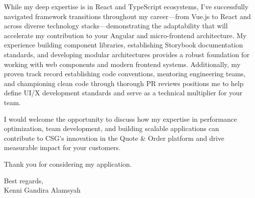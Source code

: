\documentclass[11pt]{article}
\begin{document}
\vspace{0.5em}

While my deep expertise is in React and TypeScript ecosystems, I've successfully navigated framework transitions throughout my career—from Vue.js to React and across diverse technology stacks—demonstrating the adaptability that will accelerate my contribution to your Angular and micro-frontend architecture. My experience building component libraries, establishing Storybook documentation standards, and developing modular architectures provides a robust foundation for working with web components and modern frontend systems. Additionally, my proven track record establishing code conventions, mentoring engineering teams, and championing clean code through thorough PR reviews positions me to help define UI/X development standards and serve as a technical multiplier for your team.

\vspace{0.5em}

I would welcome the opportunity to discuss how my expertise in performance optimization, team development, and building scalable applications can contribute to CSG's innovation in the Quote \& Order platform and drive measurable impact for your customers.

\vspace{0.5em}

Thank you for considering my application.

\vspace{1em}

Best regards,\\
Kenni Gandira Alamsyah
\end{document}
